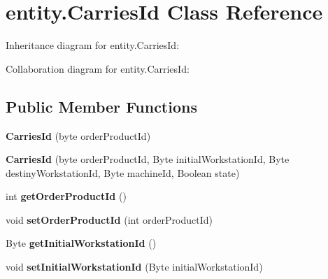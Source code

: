 \hypertarget{classentity_1_1_carries_id}{}\section{entity.\+Carries\+Id Class Reference}
\label{classentity_1_1_carries_id}


Inheritance diagram for entity.\+Carries\+Id\+:


Collaboration diagram for entity.\+Carries\+Id\+:
\subsection*{Public Member Functions}
\begin{DoxyCompactItemize}
\item 
\mbox{\label{classentity_1_1_carries_id_a51dae5e60540dcdb4b5c4a5c59ce8aed}} 
{\bfseries Carries\+Id} (byte order\+Product\+Id)
\item 
\mbox{\label{classentity_1_1_carries_id_a3c7555deb455253a857ecb72a99c0c1e}} 
{\bfseries Carries\+Id} (byte order\+Product\+Id, Byte initial\+Workstation\+Id, Byte destiny\+Workstation\+Id, Byte machine\+Id, Boolean state)
\item 
\mbox{\label{classentity_1_1_carries_id_a774d57bdffd816d281e67bd06bf62d21}} 
int {\bfseries get\+Order\+Product\+Id} ()
\item 
\mbox{\label{classentity_1_1_carries_id_a9049878112d9a3423f96ea5593afeb6f}} 
void {\bfseries set\+Order\+Product\+Id} (int order\+Product\+Id)
\item 
\mbox{\label{classentity_1_1_carries_id_a9f0d4a30dbe0db09bab463393bd6d1f5}} 
Byte {\bfseries get\+Initial\+Workstation\+Id} ()
\item 
\mbox{\label{classentity_1_1_carries_id_a2f055c85f701e12e2d93e054189414c6}} 
void {\bfseries set\+Initial\+Workstation\+Id} (Byte initial\+Workstation\+Id)
\item 
\mbox{\label{classentity_1_1_carries_id_a6806d0507a1e0e67cc2cb3668255a1b8}} 

\end{DoxyCompactItemize}
